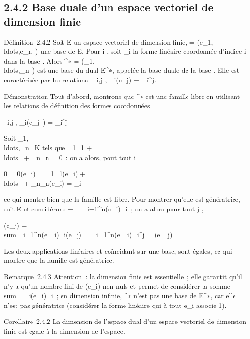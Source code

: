 \documentclass[]{article}
\begin{document}
\subsection{2.4.2 Base duale d'un espace vectoriel de dimension finie}

Définition~2.4.2 Soit E un espace vectoriel de dimension finie,  =
(e_1,\\ldots,e_n~)
une base de E. Pour i \in [1,n], soit \phi_i la forme linéaire
coordonnée d'indice i dans la base . Alors ^∗ =
(\phi_1,\\ldots,\phi_n~)
est une base du dual E^∗, appelée la base duale de la base .
Elle est caractérisée par les relations \forall~~i,j \in
[1,n], \phi_i(e_j) = \delta_i^j.

Démonstration Tout d'abord, montrons que ^∗ est une famille
libre en utilisant les relations de définition des formes coordonnées

\forall~i,j \in [1,n], \phi_i(e_j~) =
\delta_i^j

Soit
\lambda_1,\\ldots,\lambda_n~
\in K tels que \lambda_1\phi_1 +
\\ldots~ +
\lambda_n\phi_n = 0~; on a alors, pout tout i \in [1,n]

0 = 0(e_i) = \lambda_1\phi_1(e_i) +
\\ldots~ +
\lambda_n\phi_n(e_i) = \lambda_i

ce qui montre bien que la famille est libre. Pour montrer qu'elle est
génératrice, soit \phi \in E et considérons \psi =\
\sum ~
_i=1^n\phi(e_i)\phi_i~; on a alors pour tout j
\in [1,n],

\psi(e_j) = \\sum
_i=1^n\phi(e_ i)\phi_i(e_j) =
\sum _i=1^n\phi(e_
i)\delta_i^j = \phi(e_ j)

Les deux applications linéaires \phi et \psi coïncidant sur une base, sont
égales, ce qui montre que la famille est génératrice.

Remarque~2.4.3 Attention~: la dimension finie est essentielle~; elle
garantit qu'il n'y a qu'un nombre fini de \phi(e_i) non nuls et
permet de considérer la somme
\\sum ~
_i\inI\phi(e_i)\phi_i~; en dimension infinie,
^∗ n'est pas une base de E^∗, car elle n'est pas
génératrice (considérer la forme linéaire \phi qui à tout e_i
associe 1).

Corollaire~2.4.2 La dimension de l'espace dual d'un espace vectoriel de
dimension finie est égale à la dimension de l'espace.
\end{document}
